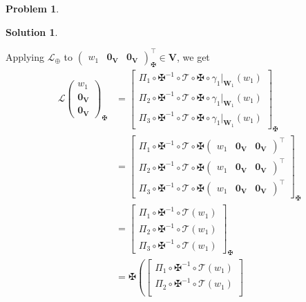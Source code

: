 \documentclass{book}
\theoremstyle{definition}
\newtheorem*{prob*}{Problem}
\newtheorem*{sln*}{Solution}
\newcommand{\V}{\mathbf{V}}
\newcommand{\W}{\mathbf{W}}
\newcommand{\lag}{\mathcal{L}}
\newcommand{\T}{\mathcal{T}}
\begin{document}
\begin{prob*}
\begin{sln*}
\begin{enumerate}
\begin{enumerate}
				Applying $\lag_\oplus$ to $\begin{pmatrix}
				w_1&\mathbf{0}_\V&\mathbf{0}_\V
				\end{pmatrix}^\top_\maltese \in \V$, we get
				\begin{align*}
				\lag\begin{pmatrix}
				w_1\\\mathbf{0}_\V\\\mathbf{0}_\V
				\end{pmatrix}_\maltese 
				&=
				\begin{bmatrix}
				\Pi_1 \circ \maltese^{-1} \circ \T \circ \maltese\circ \gamma_1\bigg\vert_{\W_1}(w_1)\\
				\Pi_2 \circ \maltese^{-1} \circ \T \circ \maltese\circ \gamma_1\bigg\vert_{\W_1}(w_1)\\
				\Pi_3 \circ \maltese^{-1} \circ \T \circ \maltese\circ \gamma_1\bigg\vert_{\W_1}(w_1)
				\end{bmatrix}_\maltese\\
				&=
				\begin{bmatrix}
				\Pi_1 \circ \maltese^{-1} \circ \T \circ \maltese
				\begin{pmatrix}
				w_1 & \mathbf{0}_\V & \mathbf{0}_\V
				\end{pmatrix}^\top\\
				\Pi_2 \circ \maltese^{-1} \circ \T \circ \maltese
				\begin{pmatrix}
				w_1 & \mathbf{0}_\V & \mathbf{0}_\V
				\end{pmatrix}^\top\\
				\Pi_3 \circ \maltese^{-1} \circ \T \circ \maltese
				\begin{pmatrix}
				w_1 & \mathbf{0}_\V & \mathbf{0}_\V
				\end{pmatrix}^\top
				\end{bmatrix}_\maltese\\
				&= 
				\begin{bmatrix}
				\Pi_1 \circ \maltese^{-1}\circ \T (w_1) \\
				\Pi_2 \circ \maltese^{-1}\circ \T (w_1) \\
				\Pi_3 \circ \maltese^{-1}\circ \T (w_1) 
				\end{bmatrix}_\maltese\\
				&=
				\maltese\left(\begin{bmatrix}
				\Pi_1 \circ \maltese^{-1}\circ \T (w_1) \\
				\Pi_2 \circ \maltese^{-1}\circ \T (w_1) \\

\end{bmatrix}
\end{align*}
\end{enumerate}
\end{enumerate}
\end{sln*}
\end{prob*}
\end{document}

